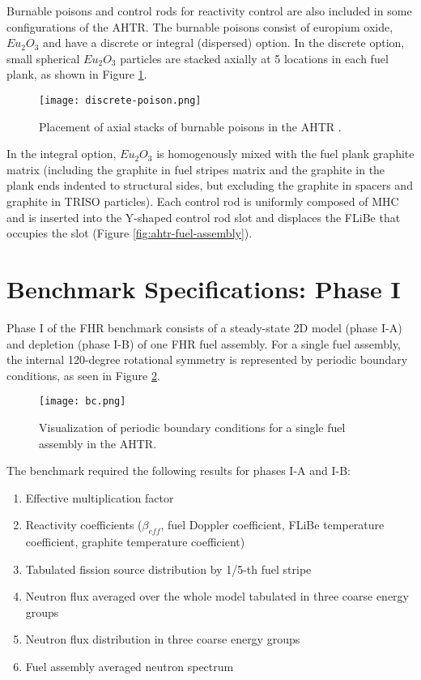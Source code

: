 Burnable poisons and control rods for reactivity control are also included in 
some configurations of the \gls{AHTR}. 
The burnable poisons consist of europium oxide, $Eu_2O_3$ and have a discrete
or integral (dispersed) option. 
In the discrete option, small spherical $Eu_2O_3$ particles are stacked axially 
at 5 locations in each fuel plank, as shown in Figure \ref{fig:discrete-poison}. 
\begin{figure}[]
    \centering
    \texttt{[image: discrete-poison.png]} 
    \caption{Placement of axial stacks of burnable poisons in the \acrlong{AHTR} 
    \cite{noauthor_fluoride_nodate}.}
    \label{fig:discrete-poison}
\end{figure}
In the integral option, $Eu_2O_3$ is homogenously mixed with the fuel plank 
graphite matrix (including the graphite in fuel stripes matrix and the 
graphite in the plank ends indented to structural sides, but excluding the 
graphite in spacers and graphite in TRISO particles). 
Each control rod is uniformly composed of \gls{MHC} and is inserted into the 
Y-shaped control rod slot and displaces the \gls{FLiBe} that occupies the slot
(Figure \ref{fig:ahtr-fuel-assembly}). 

\section{Benchmark Specifications: Phase I}
\label{sec:phase1}
Phase I of the \gls{FHR} benchmark consists of a steady-state 2D model 
(phase I-A) and depletion (phase I-B) of one \gls{FHR} fuel assembly. 
For a single fuel assembly, the internal 120-degree rotational symmetry is 
represented by periodic boundary conditions, as seen in Figure \ref{fig:bc}. 
\begin{figure}[]
    \centering
    \texttt{[image: bc.png]} 
    \caption{Visualization of periodic boundary conditions for a single fuel 
    assembly in the \gls{AHTR}\cite{noauthor_fluoride_nodate}.}
    \label{fig:bc}
\end{figure}
The benchmark required the following results for phases I-A and I-B:
\begin{enumerate}[label=(\alph*)]
    \item Effective multiplication factor 
    \item Reactivity coefficients ($\beta_{eff}$, fuel Doppler coefficient, FLiBe 
    temperature coefficient, graphite temperature coefficient)
    \item Tabulated fission source distribution by 1/5-th fuel stripe
    \item Neutron flux averaged over the whole model tabulated in three coarse energy groups
    \item Neutron flux distribution in three coarse energy groups
    \item Fuel assembly averaged neutron spectrum
\end{enumerate}

